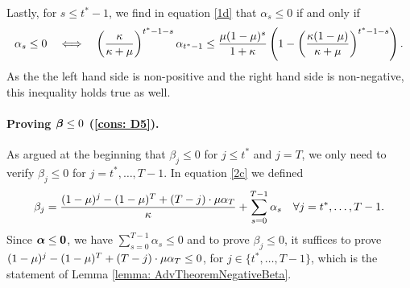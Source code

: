     Lastly, for $s \leq t^*-1$, we find in equation \eqref{1d} that $\alpha_{s} \leq 0$ if and only if 
    $$
        \alpha_{s} \leq 0 \quad  \Longleftrightarrow  \quad \left(\frac{\kappa}{\kappa+\mu}\right)^{t^* - 1 - s} \alpha_{t^* -1} \leq \frac{\mu (1-\mu)^{s}}{ 1+ \kappa} \left( 1 - \left( \frac{\kappa(1-\mu)}{\kappa +\mu} \right)^{t^* - 1 - s} \right).
    $$
    As the the left hand side is non-positive and the right hand side is non-negative, this inequality holds true as well. 
    \paragraph{Proving $\bm{\beta} \leq 0$ (\ref{cons: D5}).} As argued at the beginning that $\beta_j\leq 0$ for $j\leq t^*$ and $j=T$, we only need to verify $\beta_j\leq 0$ for $j=t^*,\ldots, T-1$. In equation \eqref{2c} we defined
    \begin{equation*}
        \beta_j = \frac{(1-\mu)^j - (1-\mu)^T + (T-j) \cdot \mu \alpha_T}{\kappa} + \sum_{s=0}^{T-1} \alpha_s \quad \forall j = t^*, \ldots, T-1.
    \end{equation*}
    Since $\bm{\alpha} \leq \mathbf{0}$, we have $\sum_{s=0}^{T-1} \alpha_s\leq 0$  and to prove $\beta_j\leq 0$, it suffices to prove $(1-\mu)^j - (1-\mu)^T + (T-j) \cdot \mu \alpha_T \leq 0$, for $j \in \{t^*, \ldots, T-1\}$, which is the statement of Lemma \ref{lemma: AdvTheoremNegativeBeta}. 


